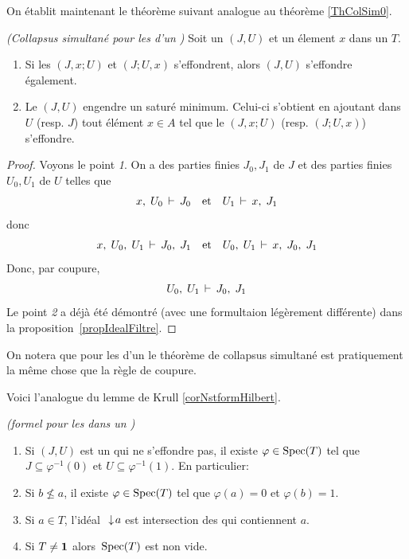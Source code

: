 On établit maintenant le théorème suivant analogue au théorème \ref{ThColSim0}.

\begin{theorem}
\label{thColSimT1} {\em (Collapsus simultané pour les \prois d'un \trdi)} Soit un
\proi $(J,U)$  et un élement $x$ dans un \trdi $T$.
\begin{enumerate}
\item  Si les \prois $(J,x;U)$ et
$(J;U,x)$  s'effondrent, alors  $(J,U)$  s'effondre également.
\item  Le \proi  $(J,U)$  engendre un \proi saturé minimum.
Celui-ci s'obtient en ajoutant dans
$U$ (resp. $J$) tout élément $x\in A$  tel que le \proi
 $(J,x;U)$
(resp. $(J;U,x)$) s'effondre.
\end{enumerate}
\end{theorem}
\begin{proof} Voyons le point \emph{1}.
On a des parties finies  $J_0,J_1$ de $J$ et des parties finies
$U_0,U_1$ de $U$ telles que
$$ x,\; U_0 \,\vdash\, J_0\quad{\rm  et}\quad   U_1  \,\vdash\, x,\; J_1
$$
donc
$$ x,\; U_0,\; U_1 \,\vdash\, J_0,\; J_1\quad{\rm  et}\quad  U_0,\; U_1 \,\vdash\,
x,\;J_0,\; J_1
$$
Donc, par coupure,
$$  U_0,\; U_1 \,\vdash\, J_0,\; J_1
$$
Le point \emph{2} a déjà été démontré (avec une formultaion
légèrement différente) dans la proposition~\ref{propIdealFiltre}.
\end{proof}

On notera que pour les \prois d'un \trdi le théorème de collapsus simultané est pratiquement la même chose que la règle de coupure.

Voici l'analogue du lemme de Krull \ref{corNstformHilbert}.
\begin{corollary}
\label{propTr2} \emph{(\nst formel pour les \prois dans un \trdi)}\\
 \Tcgi
%
\begin{enumerate}
%
\item Si $(J,U)$ est un  \proi qui ne s'effondre pas, il existe
$\varphi\in{\rm Spec}(T)$
tel que $J\subseteq \varphi^{-1}(0)$  et
$U\subseteq \varphi^{-1}(1)$.
En particulier: 
%
\item Si $b\not\leq a$, il existe $\varphi\in{\rm Spec}(T)$ tel que
$\varphi(a)=0$ et $\varphi(b)=1$.
%
\item Si $a\in T$, l'idéal $\,\,\downarrow\! a$ est intersection des \ideps qui contiennent $a$.
%
\item Si $T\neq {\bf 1}$ alors~${\rm Spec}(T)$ est non vide.
%
\end{enumerate}
\end{corollary}

